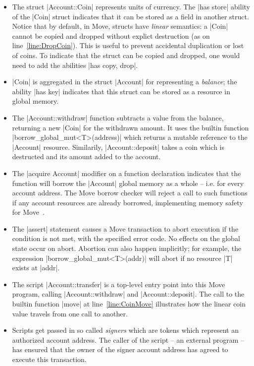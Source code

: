 \begin{itemize}
\item The struct |Account::Coin| represents units of currency. The |has store|
  ability of the |Coin| struct indicates that it can be stored as a field in
  another struct. Notice that by default, in Move, structs have \emph{linear}
  semantics: a |Coin| cannot be copied and dropped without explict destruction
  (as on line~\ref{line:DropCoin}). This is useful to prevent accidental
  duplication or lost of coins. To indicate that the struct can be copied and
  dropped, one would need to add the abilities |has copy, drop|.
\item |Coin| is aggregated in the struct |Account| for representing a
  \emph{balance}; the ability |has key| indicates that this struct can be stored
  as a resource in global memory.
\item The |Account::withdraw| function subtracts a value from the balance,
  returning a new |Coin| for the withdrawn amount.  It uses the builtin function
  |borrow_global_mut<T>(address)| which returns a mutable reference to the
  |Account| resource.  Similarily, |Account::deposit| takes a coin which is
  destructed and its amount added to the account.
\item The |acquire Account| modifier on a function declaration indicates that
  the function will borrow the |Account| global memory as a whole -- i.e. for
  every account address. The Move borrow checker will reject a call to such
  functions if any account resources are already borrowed, implementing memory
  safety for Move~\cite{BORROW_CHECKER}.
\item The |assert| statement causes a Move transaction to abort execution if the
  condition is not met, with the specified error code. No effects on the global
  state occur on abort. Abortion can also happen implicitly; for example, the
  expression |borrow_global_mut<T>(addr)| will abort if no resource |T| exists at
  |addr|.
\item The script |Account::transfer| is a top-level entry point into this Move
  program, calling |Account::withdraw| and |Account::deposit|. The call to the
  builtin function |move| at line~\ref{line:CoinMove} illustrates how the linear
  coin value travels from one call to another.
\item Scripts get passed in so called \emph{signers} which are tokens which
  represent an authorized account address. The caller of the script -- an
  external program -- has ensured that the owner of the signer account address has
  agreed to execute this transaction.
\end{itemize}

